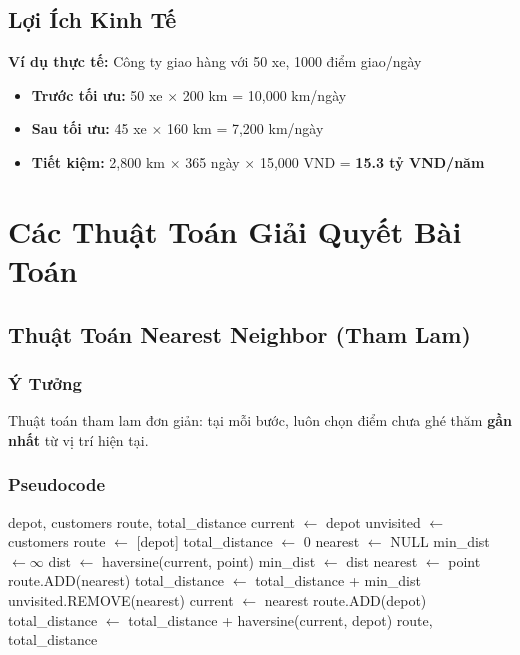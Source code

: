 \documentclass[12pt,a4paper,openany,oneside]{report}
\begin{document}
\section{Lợi Ích Kinh Tế}

\textbf{Ví dụ thực tế:} Công ty giao hàng với 50 xe, 1000 điểm giao/ngày

\begin{itemize}
    \item \textbf{Trước tối ưu:} 50 xe $\times$ 200 km = 10,000 km/ngày
    \item \textbf{Sau tối ưu:} 45 xe $\times$ 160 km = 7,200 km/ngày
    \item \textbf{Tiết kiệm:} 2,800 km $\times$ 365 ngày $\times$ 15,000 VND = \textbf{15.3 tỷ VND/năm}
\end{itemize}

\chapter{Các Thuật Toán Giải Quyết Bài Toán}

\section{Thuật Toán Nearest Neighbor (Tham Lam)}

\subsection{Ý Tưởng}

Thuật toán tham lam đơn giản: tại mỗi bước, luôn chọn điểm chưa ghé thăm \textbf{gần nhất} từ vị trí hiện tại.

\subsection{Pseudocode}

\begin{algorithm}
\caption{Nearest Neighbor Algorithm}
\begin{algorithmic}[1]
\REQUIRE depot, customers
\ENSURE route, total\_distance
\STATE current $\leftarrow$ depot
\STATE unvisited $\leftarrow$ customers
\STATE route $\leftarrow$ [depot]
\STATE total\_distance $\leftarrow$ 0
    \STATE nearest $\leftarrow$ NULL
    \STATE min\_dist $\leftarrow \infty$
        \STATE dist $\leftarrow$ haversine(current, point)
            \STATE min\_dist $\leftarrow$ dist
            \STATE nearest $\leftarrow$ point
        \ENDIF
    \ENDFOR
    \STATE route.ADD(nearest)
    \STATE total\_distance $\leftarrow$ total\_distance + min\_dist
    \STATE unvisited.REMOVE(nearest)
    \STATE current $\leftarrow$ nearest
\ENDWHILE
\STATE route.ADD(depot)
\STATE total\_distance $\leftarrow$ total\_distance + haversine(current, depot)
\RETURN route, total\_distance
\end{algorithmic}
\end{algorithm}
\end{document}
